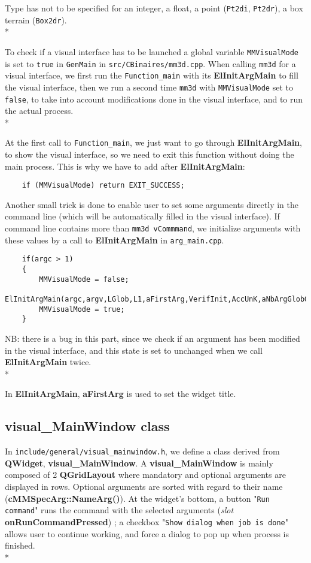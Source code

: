 Type has not to be specified for an integer, a float, a point ({\tt Pt2di}, {\tt Pt2dr}), a box terrain ({\tt Box2dr}).\\*

To check if a visual interface has to be launched a global variable {\tt MMVisualMode} is set to {\tt true} in {\tt GenMain} in {\tt src/CBinaires/mm3d.cpp}. When calling {\tt mm3d} for a visual interface, we first run the {\tt Function\_main} with its \textbf{ElInitArgMain} to fill the visual interface, then we run a second time {\tt mm3d} with {\tt MMVisualMode} set to {\tt false}, to take into account modifications done in the visual interface, and to run the actual process.\\*

At the first call to {\tt Function\_main}, we just want to go through \textbf{ElInitArgMain}, to show the visual interface, so we need to exit this function without doing the main process. This is why we have to add after \textbf{ElInitArgMain}:

\begin{verbatim}           
    if (MMVisualMode) return EXIT_SUCCESS;
\end{verbatim}

Another small trick is done to enable user to set some arguments directly in the command line (which will be automatically filled in the visual interface). If command line contains more than {\tt mm3d vCommmand}, we initialize arguments with these values by a call to \textbf{ElInitArgMain} in {\tt arg\_main.cpp}.

\begin{verbatim} 
    if(argc > 1)
    {
    	MMVisualMode = false;
    	ElInitArgMain(argc,argv,LGlob,L1,aFirstArg,VerifInit,AccUnK,aNbArgGlobGlob);
    	MMVisualMode = true;
    }
\end{verbatim}
        
NB: there is a bug in this part, since we check if an argument has been modified in the visual interface, and this state is set to unchanged when we call \textbf{ElInitArgMain} twice.\\*

In \textbf{ElInitArgMain}, \textbf{aFirstArg} is used to set the widget title.

\subsection{\textbf{visual\_MainWindow} class}

In {\tt include/general/visual\_mainwindow.h}, we define a class derived from \textbf{QWidget}, \textbf{ visual\_MainWindow}. A \textbf{visual\_MainWindow} is mainly composed of 2 \textbf{QGridLayout} where mandatory and optional arguments are displayed in rows. Optional arguments are sorted with regard to their name (\textbf{cMMSpecArg::NameArg()}). At the widget's bottom, a button "{\tt Run command}" runs the command with the selected arguments (\textit{slot} \textbf{onRunCommandPressed}) ; a checkbox "{\tt Show dialog when job is done}" allows user to continue working, and force a dialog to pop up when process is finished.\\*

